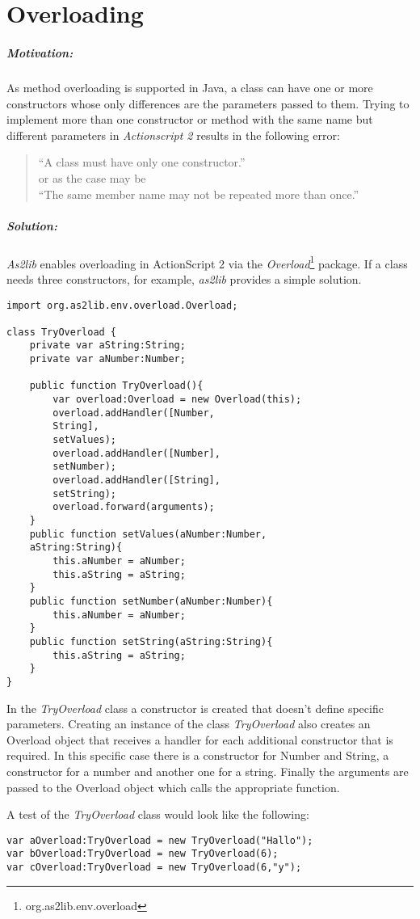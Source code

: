 \chapter{Overloading}
\label{sec:Overloading}

\paragraph{Motivation:}

As method overloading is supported in Java, a class can have one or more constructors whose only differences are the parameters passed to them. Trying to implement more than one constructor or method with the same name but different parameters in \emph{Actionscript 2} results in the following error:
\begin{quote}
	``A class must have only one constructor.''\\
	or as the case may be \\
	``The same member name may not be repeated more than once.''
\end{quote}

\paragraph{Solution:}

{\sl As2lib} enables overloading in ActionScript 2 via the \emph{Overload}\footnote{org.as2lib.env.overload} package. If a class needs three constructors, for example, {\sl as2lib} provides a simple solution.

\begin{lstlisting}[frame=single]
import org.as2lib.env.overload.Overload;

class TryOverload {
	private var aString:String;
	private var aNumber:Number;
	
	public function TryOverload(){
		var overload:Overload = new Overload(this);
		overload.addHandler([Number, 
		String], 
		setValues);
		overload.addHandler([Number], 
		setNumber);
		overload.addHandler([String],
		setString);
		overload.forward(arguments);
	}
	public function setValues(aNumber:Number, 
	aString:String){
		this.aNumber = aNumber;
		this.aString = aString;
	}
	public function setNumber(aNumber:Number){
		this.aNumber = aNumber;
	}
	public function setString(aString:String){
		this.aString = aString;
	}
}
\end{lstlisting}

In the \emph{TryOverload} class a constructor is created that doesn't define specific parameters. Creating an instance of the class \emph{TryOverload} also creates an Overload object that receives a handler for each additional constructor that is required. In this specific case there is a constructor for Number and String, a constructor for a number and another one for a string. Finally the arguments are passed to the Overload object which calls the appropriate function.

A test of the \emph{TryOverload} class would look like the following:

\begin{lstlisting}[frame=single]
var aOverload:TryOverload = new TryOverload("Hallo");
var bOverload:TryOverload = new TryOverload(6);
var cOverload:TryOverload = new TryOverload(6,"y");
\end{lstlisting}
